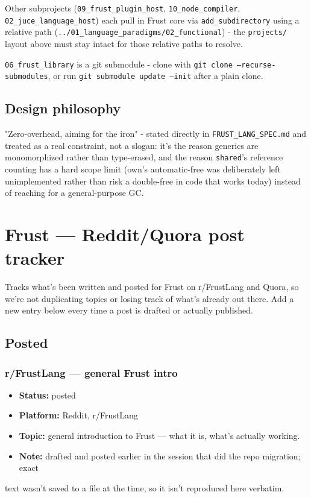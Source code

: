 \documentclass{book}
\begin{document}
Other subprojects (\texttt{09_frust_plugin_host}, \texttt{10_node_compiler},
\texttt{02_juce_language_host}) each pull in Frust core via \texttt{add_subdirectory}
using a relative path (\texttt{../01_language_paradigms/02_functional}) - the
\texttt{projects/} layout above must stay intact for those relative paths to
resolve.

\texttt{06_frust_library} is a git submodule - clone with
\texttt{git clone --recurse-submodules}, or run
\texttt{git submodule update --init} after a plain clone.

\section{Design philosophy}

"Zero-overhead, aiming for the iron" - stated directly in
\texttt{FRUST_LANG_SPEC.md}
and treated as a real constraint, not a slogan: it's the reason
generics are monomorphized rather than type-erased, and the reason
\texttt{shared}'s reference counting has a hard scope limit (own's
automatic-free was deliberately left unimplemented rather than risk a
double-free in code that works today) instead of reaching for a
general-purpose GC.


\chapter{Frust — Reddit/Quora post tracker}

Tracks what's been written and posted for Frust on r/FrustLang and Quora, so we're not
duplicating topics or losing track of what's already out there. Add a new entry below
every time a post is drafted or actually published.

\section{Posted}

\subsection{r/FrustLang — general Frust intro}
\begin{itemize}
\item \textbf{Status:} posted
\item \textbf{Platform:} Reddit, r/FrustLang
\item \textbf{Topic:} general introduction to Frust — what it is, what's actually working.
\item \textbf{Note:} drafted and posted earlier in the session that did the repo migration; exact
\end{itemize}
  text wasn't saved to a file at the time, so it isn't reproduced here verbatim.
\end{document}
